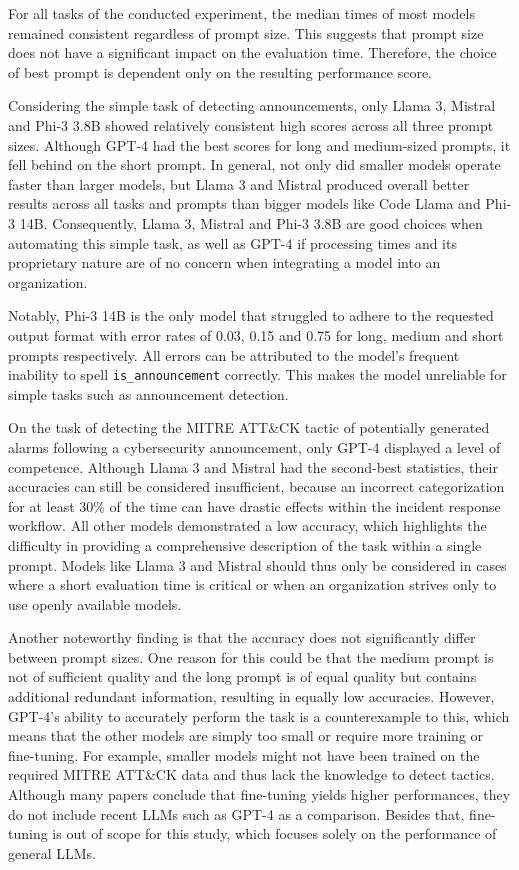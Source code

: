 For all tasks of the conducted experiment, the median times of most models remained consistent regardless of prompt
size.
This suggests that prompt size does not have a significant impact on the evaluation time.
Therefore, the choice of best prompt is dependent only on the resulting performance score.

Considering the simple task of detecting announcements, only Llama 3, Mistral and Phi-3 3.8B showed relatively
consistent high scores across all three prompt sizes.
Although GPT-4 had the best scores for long and medium-sized prompts, it fell behind on the short prompt.
In general, not only did smaller models operate faster than larger models, but Llama 3 and Mistral produced overall
better results across all tasks and prompts than bigger models like Code Llama and Phi-3 14B\@.
Consequently, Llama 3, Mistral and Phi-3 3.8B are good choices when automating this simple task, as well as GPT-4 if
processing times and its proprietary nature are of no concern when integrating a model into an organization.

Notably, Phi-3 14B is the only model that struggled to adhere to the requested output format with error rates of 0.03,
0.15 and 0.75 for long, medium and short prompts respectively.
All errors can be attributed to the model's frequent inability to spell \texttt{is\_announcement} correctly.
This makes the model unreliable for simple tasks such as announcement detection.
%

On the task of detecting the MITRE ATT\&CK tactic of potentially generated alarms following a cybersecurity
announcement, only GPT-4 displayed a level of competence.
Although Llama 3 and Mistral had the second-best statistics, their accuracies can still be considered insufficient,
because an incorrect categorization for at least 30\% of the time can have drastic effects within the incident response
workflow.
All other models demonstrated a low accuracy, which highlights the difficulty in providing a comprehensive description
of the task within a single prompt.
Models like Llama 3 and Mistral should thus only be considered in cases where a short evaluation time is critical or
when an organization strives only to use openly available models.

Another noteworthy finding is that the accuracy does not significantly differ between prompt sizes.
One reason for this could be that the medium prompt is not of sufficient quality and the long prompt is of equal quality
but contains additional redundant information, resulting in equally low accuracies.
However, GPT-4's ability to accurately perform the task is a counterexample to this, which means that the other models
are simply too small or require more training or fine-tuning.
For example, smaller models might not have been trained on the required MITRE ATT\&CK data and thus lack the knowledge
to detect tactics.
Although many papers conclude that fine-tuning yields higher performances, they do not include recent LLMs such as
GPT-4 as a comparison.
Besides that, fine-tuning is out of scope for this study, which focuses solely on the performance of general LLMs.

